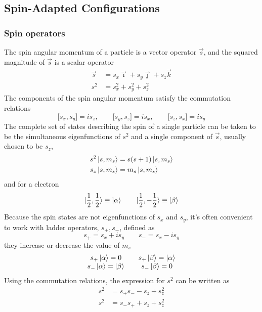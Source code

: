 \documentclass[11pt]{article}
\begin{document}
\subsection{Spin-Adapted Configurations}
\subsubsection{Spin operators}
The spin angular momentum of a particle is a vector operator $\vec{s}$, and the squared magnitude of $\vec{s}$ is a scalar operator
\begin{align}
    \vec{s}&=s_x\vec{\imath}+s_y\vec{\jmath}+s_z\vec{k}\\
    s^2&=s_x^2+s_y^2+s_z^2
\end{align}
The components of the spin angular momentum satisfy the commutation relations
\begin{equation}
    \bigl[s_x,s_y\bigr]=is_z,\qquad\bigl[s_y,s_z\bigr]=is_x,\qquad\bigl[s_z,s_x\bigr]=is_y
\end{equation}
The complete set of states describing the spin of a single particle can be taken to be the simultaneous eigenfunctions of $s^2$ and a single
component of $\vec{s}$, usually chosen to be $s_z$,
\begin{align}
    s^2\ket{s,m_s}&=s(s+1)\ket{s,m_s}\\
    s_z\ket{s,m_s}&=m_s\ket{s,m_s}
\end{align}
and for a electron
\begin{equation}
    \ket{\frac{1}{2},\frac{1}{2}}\equiv\ket{\alpha}\qquad\ket{\frac{1}{2},-\frac{1}{2}}\equiv\ket{\beta}
\end{equation}
Because the spin states are not eigenfunctions of $s_x$ and $s_y$, it's often convenient to work with ladder operators, $s_+,s_-$, defined as
\begin{equation}
    s_+=s_x+is_y \qquad s_-=s_x-is_y
\end{equation}
they increase or decrease the value of $m_s$
\begin{align}
    \begin{matrix}
        s_+\ket{\alpha}=0 && s_+\ket{\beta}=\ket{\alpha}\\
        s_-\ket{\alpha}=\ket{\beta} && s_-\ket{\beta}=0
    \end{matrix}
\end{align}
Using the commutation relations, the expression for $s^2$ can be written as
\begin{align}
    s^2&=s_+s_- -s_z+s_z^2\\
    s^2&=s_-s_+ +s_z+s_z^2
\end{align}
\end{document}
